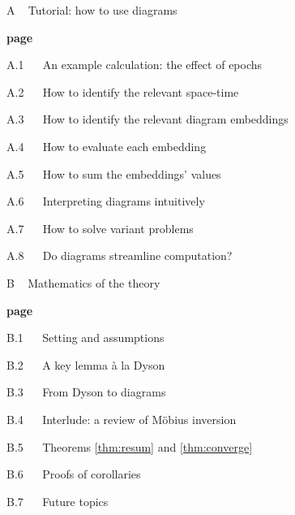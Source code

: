 \documentclass[anon,12pt]{colt2021} %
\begin{document}
        {\bf
        \par\noindent A ~ Tutorial: how to use diagrams}                        \hfill {\bf page \pageref{appendix:tutorial}}
        \par\indent     A.1 ~~ An example calculation: the effect of epochs     \hfill \pageref{appendix:example}
        \par\indent     A.2 ~~ How to identify the relevant space-time          \hfill \pageref{appendix:draw-spacetime} 
        \par\indent     A.3 ~~ How to identify the relevant diagram embeddings  \hfill \pageref{appendix:draw-embeddings}
        \par\indent     A.4 ~~ How to evaluate each embedding                   \hfill \pageref{appendix:evaluate-embeddings}
        \par\indent     A.5 ~~ How to sum the embeddings' values                \hfill \pageref{appendix:sum-embeddings}
        \par\indent     A.6 ~~ Interpreting diagrams intuitively                \hfill \pageref{appendix:interpret-diagrams}
        \par\indent     A.7 ~~ How to solve variant problems                    \hfill \pageref{appendix:solve-variants}
        \par\indent     A.8 ~~ Do diagrams streamline computation?              \hfill \pageref{appendix:diagrams-streamline}
    
        {\bf
        \par\noindent B ~ Mathematics of the theory}                            \hfill {\bf page \pageref{appendix:math}}
        \par\indent     B.1 ~~ Setting and assumptions                          \hfill \pageref{appendix:assumptions}
        \par\indent     B.2 ~~ A key lemma \`a la Dyson                         \hfill \pageref{appendix:key-lemma}
        \par\indent     B.3 ~~ From Dyson to diagrams                           \hfill \pageref{appendix:toward-diagrams}
        \par\indent     B.4 ~~ Interlude: a review of M\"obius inversion        \hfill \pageref{appendix:mobius}
        \par\indent     B.5 ~~ Theorems \ref{thm:resum} and \ref{thm:converge}  \hfill \pageref{appendix:resum}
        \par\indent     B.6 ~~ Proofs of corollaries                            \hfill \pageref{appendix:corollaries}
        \par\indent     B.7 ~~ Future topics                                    \hfill \pageref{appendix:future}
    
\end{document}
